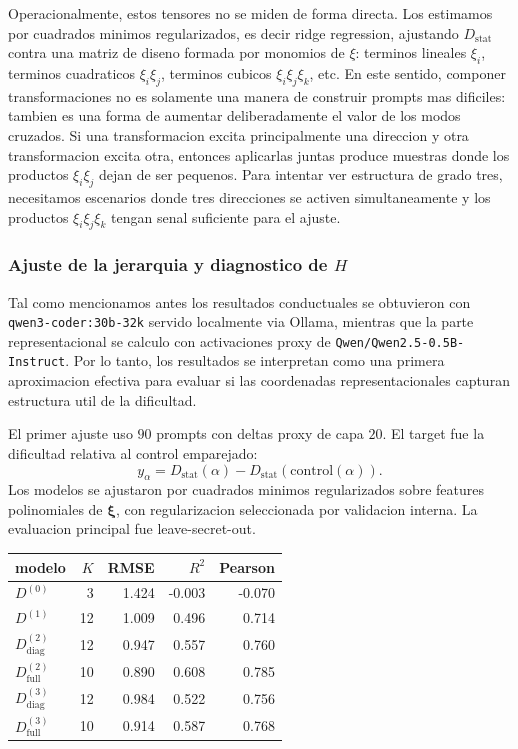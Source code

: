 ﻿\documentclass[10pt,twocolumn]{article}
\newcommand{\Dstat}{D_{\mathrm{stat}}}
\newcommand{\xrep}{\bm{\xi}}
\begin{document}
Operacionalmente, estos tensores no se miden de forma directa. Los estimamos por cuadrados minimos regularizados, es decir ridge regression, ajustando \(\Dstat\) contra una matriz de diseno formada por monomios de \(\xi\): terminos lineales \(\xi_i\), terminos cuadraticos \(\xi_i\xi_j\), terminos cubicos \(\xi_i\xi_j\xi_k\), etc. En este sentido, componer transformaciones no es solamente una manera de construir prompts mas dificiles: tambien es una forma de aumentar deliberadamente el valor de los modos cruzados. Si una transformacion excita principalmente una direccion y otra transformacion excita otra, entonces aplicarlas juntas produce muestras donde los productos \(\xi_i\xi_j\) dejan de ser pequenos. Para intentar ver estructura de grado tres, necesitamos escenarios donde tres direcciones se activen simultaneamente y los productos \(\xi_i\xi_j\xi_k\) tengan senal suficiente para el ajuste.

\subsubsection*{Ajuste de la jerarquia y diagnostico de \texorpdfstring{\(H\)}{H}}

Tal como mencionamos antes los resultados conductuales se obtuvieron con \texttt{qwen3-coder:30b-32k} servido localmente via Ollama, mientras que la parte representacional se calculo con activaciones proxy de \texttt{Qwen/Qwen2.5-0.5B-Instruct}. Por lo tanto, los resultados se interpretan como una primera aproximacion efectiva para evaluar si las coordenadas representacionales capturan estructura util de la dificultad.

El primer ajuste uso \(90\) prompts con deltas proxy de capa \(20\). El target fue la dificultad relativa al control emparejado:
\[
y_\alpha
=
D_{\mathrm{stat}}(\alpha)
-
D_{\mathrm{stat}}(\mathrm{control}(\alpha)).
\]
Los modelos se ajustaron por cuadrados minimos regularizados sobre features polinomiales de \(\xrep\), con regularizacion seleccionada por validacion interna. La evaluacion principal fue leave-secret-out.

\begin{center}
\scriptsize
\begin{tabular}{@{}lrrrr@{}}
\toprule
modelo & \(K\) & RMSE & \(R^2\) & Pearson \\
\midrule
\(D^{(0)}\) & 3 & 1.424 & -0.003 & -0.070 \\
\(D^{(1)}\) & 12 & 1.009 & 0.496 & 0.714 \\
\(D^{(2)}_{\mathrm{diag}}\) & 12 & 0.947 & 0.557 & 0.760 \\
\(D^{(2)}_{\mathrm{full}}\) & 10 & 0.890 & 0.608 & 0.785 \\
\(D^{(3)}_{\mathrm{diag}}\) & 12 & 0.984 & 0.522 & 0.756 \\
\(D^{(3)}_{\mathrm{full}}\) & 10 & 0.914 & 0.587 & 0.768 \\
\bottomrule
\end{tabular}
\end{center}
\end{document}
